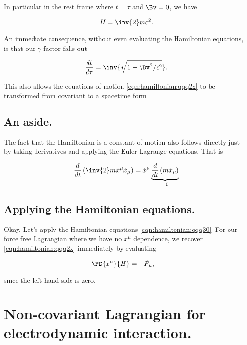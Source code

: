 In particular in the rest frame where $t = \tau$ and $\Bv = 0$, we have

\begin{align}\label{eqn:hamiltonian:qqq11}
H = \inv{2} m c^2.
\end{align}

An immediate consequence, without even evaluating the Hamiltonian equations, is that our $\gamma$ factor falls out

\begin{align}\label{eqn:hamiltonian:qqq12}
\frac{dt}{d\tau} = \inv{\sqrt{1 - \Bv^2/c^2}}.
\end{align}

This also allows the equations of motion \ref{eqn:hamiltonian:qqq2x} to be transformed from covariant to a spacetime form


\subsection{An aside.}

The fact that the Hamiltonian is a constant of motion also follows directly just by taking derivatives and applying the Euler-Lagrange equations.  That is

\begin{align*}
\frac{d}{dt} \left( \inv{2} m \dot{x}^\mu \dot{x}_\mu \right) 
=
\dot{x}^\mu \underbrace{\frac{d}{dt} \left( m \dot{x}_\mu \right)}_{=0} \\
\end{align*}

\subsection{Applying the Hamiltonian equations.}

Okay.  Let's apply the Hamiltonian equations \ref{eqn:hamiltonian:qqq30}.  For our force free Lagrangian where we have no $x^\mu$ dependence, we recover \ref{eqn:hamiltonian:qqq2x} immediately by evaluating

\begin{align}\label{eqn:hamiltonian:qqq30b}
\PD{x^\mu}{H} &= -\dot{P}_\mu,
\end{align}

since the left hand side is zero.

\section{Non-covariant Lagrangian for electrodynamic interaction.}


